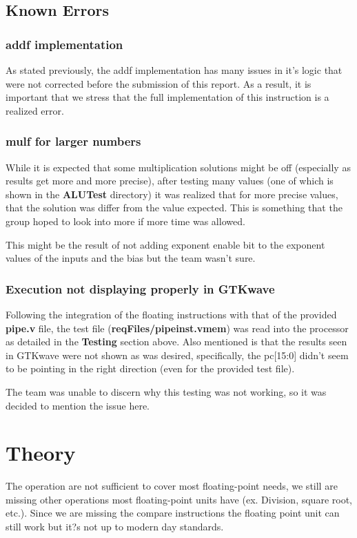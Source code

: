 \documentclass[conference]{IEEEtran}
\begin{document}
\subsection{Known Errors}
\subsubsection{addf implementation}
As stated previously, the addf implementation has many issues in it's logic that were not corrected before
the submission of this report. As a result, it is important that we stress that the full implementation of 
this instruction is a realized error. 

\subsubsection{mulf for larger numbers}
While it is expected that some multiplication solutions might be off (especially as results get more and 
more precise), after testing many values (one of which is shown in the \textbf{ALUTest} directory) it was 
realized that for more precise values, that the solution was differ from the value expected. This is 
something that the group hoped to look into more if more time was allowed. 

This might be the result of not adding exponent enable bit to the exponent values of the inputs and the
 bias but the team wasn't sure. 

\subsubsection{Execution not displaying properly in GTKwave}
Following the integration of the floating instructions with that of the provided \textbf{pipe.v} file, the test
file (\textbf{reqFiles/pipeinst.vmem}) was read into the processor as detailed in the \textbf{Testing} section 
above. Also mentioned is that the results seen in GTKwave were not shown as was desired, specifically, 
the pc[15:0] didn't seem to be pointing in the right direction (even for the provided test file). 

The team was unable to discern why this testing was not working, so it was decided to mention the issue 
here. 

\section{Theory}
The operation are not sufficient to cover most floating-point needs, we still are missing other operations
most floating-point units have (ex. Division, square root, etc.). Since we are missing the compare
instructions the floating point unit can still work but it?s not up to modern day standards.
\end{document}
